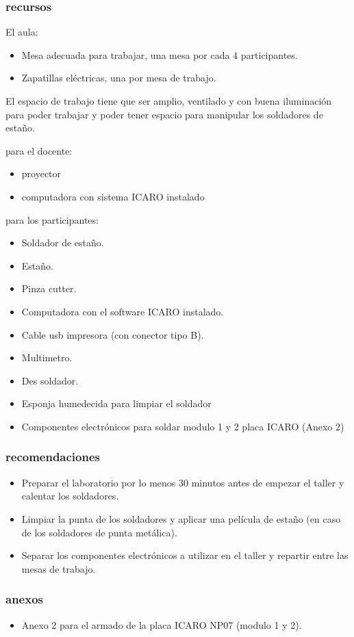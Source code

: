 \subsubsection{recursos}
El aula:
\begin{itemize}
  \item Mesa adecuada para trabajar, una mesa por cada 4 participantes.
  \item Zapatillas eléctricas, una por mesa de trabajo.
\end{itemize}
El espacio de trabajo tiene que ser amplio, ventilado y con buena iluminación para poder trabajar y poder tener espacio para manipular los soldadores de estaño.    

para el docente:
\begin{itemize}
  \item proyector
  \item computadora con sistema ICARO instalado
\end{itemize}
para los participantes:
\begin{itemize}
  \item Soldador de estaño.
  \item Estaño.
  \item Pinza cutter.
  \item Computadora con el software ICARO instalado.
  \item Cable usb impresora (con conector tipo B).
  \item Multimetro.
  \item Des soldador.
  \item Esponja humedecida para limpiar el soldador
  \item Componentes electrónicos para soldar modulo 1 y 2 placa ICARO (Anexo 2) 
\end{itemize}

\subsubsection{recomendaciones}

\begin{itemize}
  \item Preparar el laboratorio por lo menos 30 minutos antes de empezar el taller y calentar los soldadores.

  \item Limpiar la punta de los soldadores y aplicar una película de estaño (en caso de los soldadores de punta metálica).

  \item Separar los componentes electrónicos a utilizar en el taller y repartir entre las mesas de trabajo.

\end{itemize}

\subsubsection{anexos}
\begin{itemize}
  \item Anexo 2 para el armado de la placa ICARO NP07 (modulo 1 y 2).
\end{itemize}
\newpage
